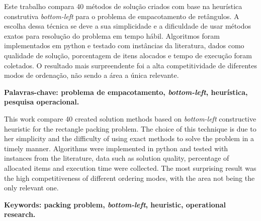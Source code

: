 
\begin{resumo}
    Este trabalho compara 40 métodos de solução criados com base na heurística construtiva
    \textit{bottom-left} para o problema de empacotamento de retângulos.
    A escolha dessa técnica se deve a sua simplicidade e a dificuldade de usar métodos exatos
    para resolução do problema em tempo hábil.
    Algoritmos foram implementados em python e testado com instâncias da literatura, dados como
    qualidade de solução, porcentagem de itens alocados e tempo de execução foram coletados.
    O resultado mais surpreendente foi a alta competitividade de diferentes modos de ordenação,
    não sendo a área a única relevante.

    \textbf{Palavras-chave: problema de empacotamento, \textit{bottom-left}, heurística,
        pesquisa operacional.}
\end{resumo}
\newpage

\begin{resumo}[Abstract]
    This work compare 40 created solution methods based on \textit{bottom-left} constructive
    heuristic for the rectangle packing problem.
    The choice of this technique is due to her simplicity and the difficulty of using exact methods
    to solve the problem in a timely manner.
    Algorithms were implemented in python and tested with instances from the literature,
    data such as solution quality, percentage of allocated items and execution time were collected.
    The most surprising result was the high competitiveness of different ordering modes,
    with the area not being the only relevant one.

    \textbf{Keywords: packing problem, \textit{bottom-left}, heuristic, operational research.}
\end{resumo}
\newpage
